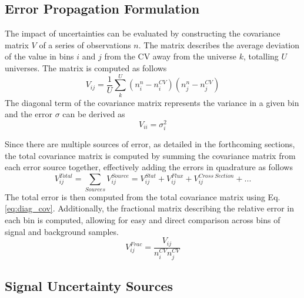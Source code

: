 \subsection{Error Propagation Formulation}
\label{sec:error_prop}

The impact of uncertainties can be evaluated by constructing the covariance matrix $V$ of a series of observations $n$.
The matrix describes the average deviation of the value in bins $i$ and $j$ from the CV away from the universe $k$, totalling $U$ universes.
The matrix is computed as follows
\begin{equation}
	V_{ij} = \frac{1}{U}\sum^{U}_{k} \left( n^n_{i} - n^{CV}_{i} \right) \left( n^n_{j} - n^{CV}_{j} \right)
\end{equation}
The diagonal term of the covariance matrix represents the variance in a given bin and the error $\sigma$ can be derived as
\begin{equation}
\label{eq:diag_cov}
	V_{ii} = \sigma^2_i
\end{equation}

Since there are multiple sources of error, as detailed in the forthcoming sections, the total covariance matrix is computed by summing the covariance matrix from each error source together, effectively adding the errors in quadrature as follows
\begin{equation}
	V^{Total}_{ij} = \sum_{Sources} V_{ij}^{Source} = V_{ij}^{Stat} + V_{ij}^{Flux} +V_{ij}^{Cross\ Section} + ...
\end{equation}
The total error is then computed from the total covariance matrix using Eq. \ref{eq:diag_cov}.
Additionally, the fractional matrix describing the relative error in each bin is computed, allowing for easy and direct comparison across bins of signal and background samples. 
\begin{equation}
	V_{ij}^{Frac} = \frac{V_{ij}}{n_i^{CV}n_j^{CV}}
\end{equation}

\subsection{Signal Uncertainty Sources}
\label{sec:signal_error}

